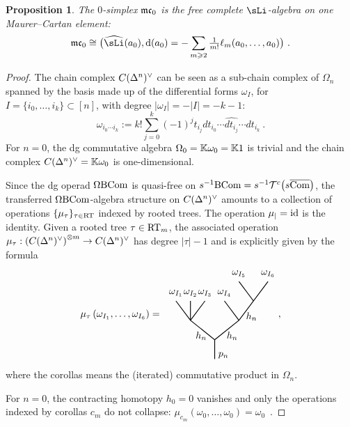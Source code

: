 \documentclass[twoside, 10pt]{amsart}
\newtheorem{proposition}[lemma]{Proposition}
\begin{document}
\begin{proposition}\label{prop:mc0}
The $0$-simplex $\mathfrak{mc}_0$ is the free complete $\sLi$-algebra on one Maurer--Cartan element:
\[\mc_0\cong 
\big(\widehat{\sLi}(a_0), \d(a_0)=-\sum_{m\geqslant 2} {\textstyle \frac{1}{m!}}\ell_m(a_0, \ldots, a_0)
\big)
\ .\]
\end{proposition}

\begin{proof}
The chain complex $C(\mathrm{\Delta}^{n})^\vee$ can be seen as a sub-chain complex of $\Omega_n$ spanned by the  basis made up of the differential forms  $\omega_I$, for $I=\{i_0,\ldots, i_k\}\subset[n]$, with degree $|\omega_I|=-|I|=-k-1$:
\[
\omega_{i_0\cdots i_k}:=k!\sum_{j=0}^k (-1)^jt_{i_j} dt_{i_0}\cdots \widehat{dt_{i_j}}\cdots dt_{i_k} \ .
\]
For $n=0$, the dg commutative algebra $\Omega_0=\mathbb{K} \omega_0={\mathbb{K}} 1$ is trivial and the chain complex 
$C(\mathrm{\Delta}^{n})^\vee=\mathbb{K} \omega_0$ is one-dimensional. 

Since the dg operad $\Omega \mathrm{B} \mathrm{Com}$ is quasi-free on $s^{-1} \mathrm{B} \mathrm{Com}=s^{-1}\mathcal{T}^c\big(s\overline{\mathrm{Com}}\big)$, the transferred $\Omega \mathrm{B} \mathrm{Com}$-algebra structure on $C(\mathrm{\Delta}^{n})^\vee$ amounts to a collection of operations 
$\{\mu_\tau\}_{\tau \in \mathrm{RT}}$ indexed by rooted trees. The operation $\mu_{|}=\mathrm{id}$ is the identity. Given a rooted tree $\tau\in \mathrm{RT}_m$, the associated operation $\mu_\tau : \left(C(\mathrm{\Delta}^{n})^\vee\right)^{\otimes m} \to C(\mathrm{\Delta}^{n})^\vee$ has degree $|\tau|-1$ and is explicitly given by the formula 
\[\mu_\tau\left(
\omega_{I_1}, \ldots, \omega_{I_6}
\right)=
\vcenter{\hbox{
\begin{tikzpicture}[yscale=0.7,xscale=0.7]

\draw[thick] (-2,2)--(-1.25,1) -- (0,0) -- (0,-1);
\draw[thick] (-1.25,2) -- (-1.25,1); 
\draw[thick] (-0.5,2) -- (-1.25,1); 
\draw[thick] (0,0) -- (1.25,1) -- (2,2)--(2.75,3); 
\draw[thick] (0.5,2) -- (1.25,1); 
\draw[thick] (1.25,3) -- (2,2); 

\node at (-2,2.4) {$\omega_{I_1}$};
\node at (-1.25,2.4) {$\omega_{I_2}$};
\node at (-0.5,2.4) {$\omega_{I_3}$};
\node at (0.5,2.4) {$\omega_{I_4}$};
\node at (1.25,3.4) {$\omega_{I_5}$};
\node at (2.75,3.4) {$\omega_{I_6}$};

\node at (-0.7,0.2) {$h_n$};
\node at (0.9,0.2) {$h_n$};
\node at (1.9,1.2) {$h_n$};
\node at (0.45,-0.8) {$p_n$};
\end{tikzpicture}}},\]
where the corollas means the (iterated) commutative product in $\Omega_n$.

For $n=0$, the contracting homotopy $h_0=0$ vanishes and only the operations indexed by corollas $c_m$ do not collapse:
$\mu_{c_m}(\omega_0, \ldots, \omega_0)=\omega_0$\ . 


\end{proof}
\end{document}
